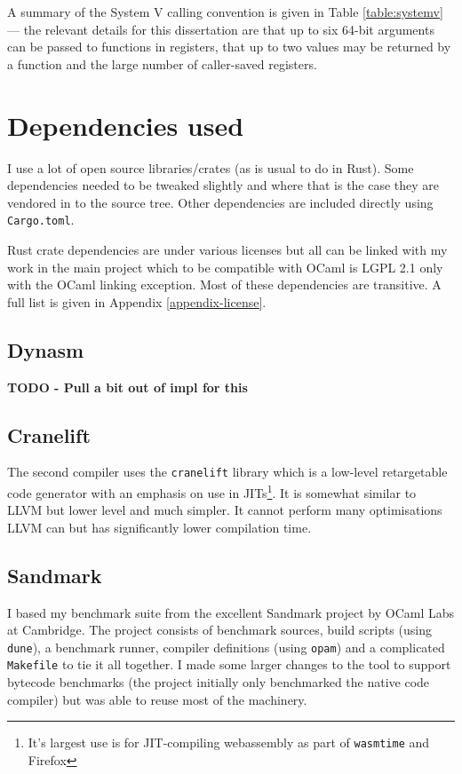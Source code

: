 A summary of the System V calling convention is given in Table \ref{table:systemv} --- the relevant
details for this dissertation are
that up to six 64-bit arguments can be passed to functions in registers, that up to two values may
be returned by a
function
and the large number of caller-saved registers.
\section{Dependencies used}

I use a lot of open source libraries/crates (as is usual to do in Rust). Some dependencies needed
to be tweaked slightly and where that is the case they are vendored in to the source tree. Other
dependencies are included directly using \texttt{Cargo.toml}.

Rust crate dependencies are under various licenses but all can be linked with my work in the main
project which to be compatible with OCaml is LGPL 2.1 only with the OCaml linking exception. Most
of
these dependencies are transitive. A full list is given in Appendix \ref{appendix-license}.

\subsection{Dynasm}

\textbf{TODO - Pull a bit out of impl for this}

\subsection{Cranelift}

The second compiler uses the \texttt{cranelift} \cite{cranelift} library which is a low-level
retargetable code generator with an emphasis on use in JITs\footnote{It's largest use is for
    JIT-compiling webassembly as part of \texttt{wasmtime} and Firefox}. It is somewhat similar to
LLVM
but lower level and much simpler. It cannot perform many optimisations LLVM can but has
significantly lower compilation time.

\subsection{Sandmark}

I based my benchmark suite from the excellent Sandmark project by OCaml Labs at Cambridge. The
project consists of benchmark sources, build scripts (using \texttt{dune}), a benchmark runner,
compiler definitions (using \texttt{opam}) and a complicated \texttt{Makefile} to tie it all
together.  I made some larger changes to the tool to support bytecode benchmarks (the project
initially only benchmarked the native code compiler) but was able to reuse most of the machinery.

